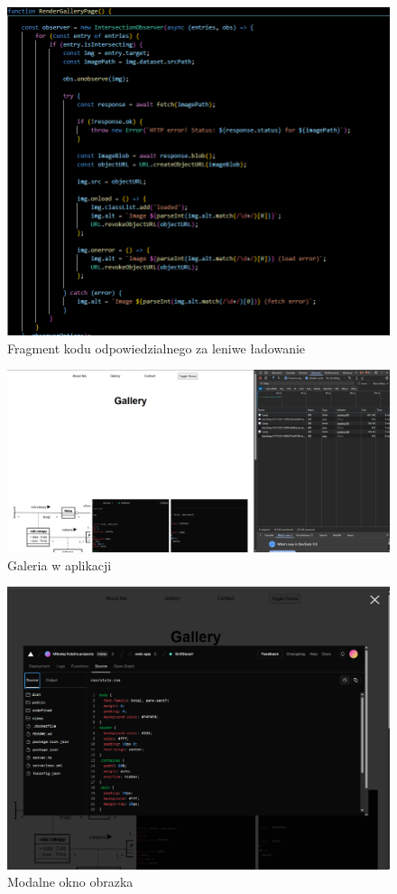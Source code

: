 \documentclass[a4paper,12pt]{article}
\begin{document}
\begin{figure}[H]
    \centering
    \includegraphics[width=1\textwidth]{images/lazy.png}
    \caption{Fragment kodu odpowiedzialnego za leniwe ładowanie}
\end{figure}

\begin{figure}[H]
    \centering
    \includegraphics[width=1\textwidth]{images/gallery.png}
    \caption{Galeria w aplikacji}
\end{figure}

\begin{figure}[H]
    \centering
    \includegraphics[width=1\textwidth]{images/modal.png}
    \caption{Modalne okno obrazka}
\end{figure}
\end{document}

